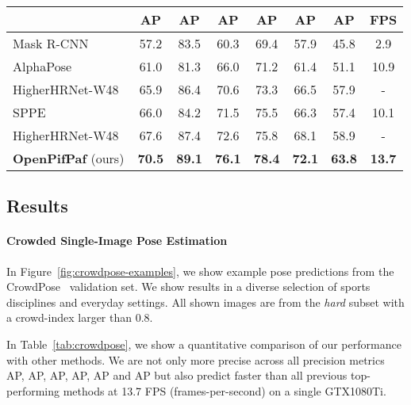 \documentclass[journal]{IEEEtran}
\begin{document}
\begin{table*}
  \centering
  \caption{Evaluation on the CrowdPose test dataset~\cite{li2019crowdpose}. Our OpenPifPaf result is based on a ResNet50 backbone with single-scale evaluation at 641px. Values extracted from CrowdPose paper~\cite{li2019crowdpose}. Employs multi-scale testing.}
  \label{tab:crowdpose}
  \begin{tabular}{|l|c c c c c c c|}
    \hline
                                              & AP & AP & AP & AP & AP & AP & FPS \\
    \hline\hline
    Mask R-CNN~\cite{he2017mask}        & 57.2 & 83.5    & 60.3   & 69.4 & 57.9 & 45.8   & 2.9 \\
    AlphaPose~\cite{fang2017rmpe}       & 61.0 & 81.3    & 66.0   & 71.2 & 61.4 & 51.1   & 10.9 \\
    HigherHRNet-W48~\cite{cheng2020higherhrnet} & 65.9 & 86.4  & 70.6   & 73.3 & 66.5 & 57.9   & - \\
    SPPE~\cite{li2019crowdpose}               & 66.0 & 84.2    & 71.5   & 75.5 & 66.3 & 57.4   & 10.1 \\
    HigherHRNet-W48~\cite{cheng2020higherhrnet} & 67.6 & 87.4 & 72.6  & 75.8 & 68.1 & 58.9  & - \\

    \textbf{OpenPifPaf} (ours)
    & \textbf{70.5} & \textbf{89.1} & \textbf{76.1}  & \textbf{78.4} & \textbf{72.1} & \textbf{63.8}   & \textbf{13.7} \\
    \hline
  \end{tabular}
\end{table*}



\subsection{Results}

\paragraph{Crowded Single-Image Pose Estimation}
In Figure~\ref{fig:crowdpose-examples}, we show example pose predictions from
the CrowdPose~\cite{li2019crowdpose} validation set. We show results
in a diverse selection of sports disciplines and everyday settings. All shown
images are from the \emph{hard} subset with a crowd-index larger than 0.8.

In Table~\ref{tab:crowdpose}, we show a quantitative comparison of our
performance with other methods. We are not only more precise across all
precision metrics AP, AP, AP, AP,
AP and AP but also predict faster than all
previous top-performing methods at 13.7 FPS (frames-per-second)
on a single GTX1080Ti.
\end{document}

